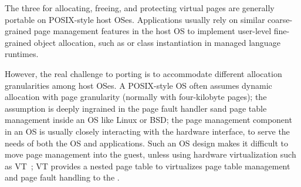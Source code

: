 The three \hostapis{} for allocating, freeing, and protecting virtual pages
are generally portable on POSIX-style host OSes.
Applications usually rely on
similar coarse-grained page management features
in the host OS
to implement user-level fine-grained
object allocation,
such as  or class instantiation in managed language runtimes.


However, the real challenge to
porting \thehostabi{}
is to accommodate different allocation granularities among host OSes.
A POSIX-style OS often assumes dynamic allocation with page granularity (normally with four-kilobyte pages);
the assumption is deeply ingrained in the page fault handler sand page table management
inside an OS like Linux or BSD;
the page management component in an OS
is usually closely interacting with the hardware interface,
to serve the needs of both the OS and applications.
Such an OS design makes it difficult to move page management
into the guest, unless using hardware virtualization such as
VT~\cite{VT}; VT provides a nested page table to virtualizes page table management and page fault handling to the \libos{}.



